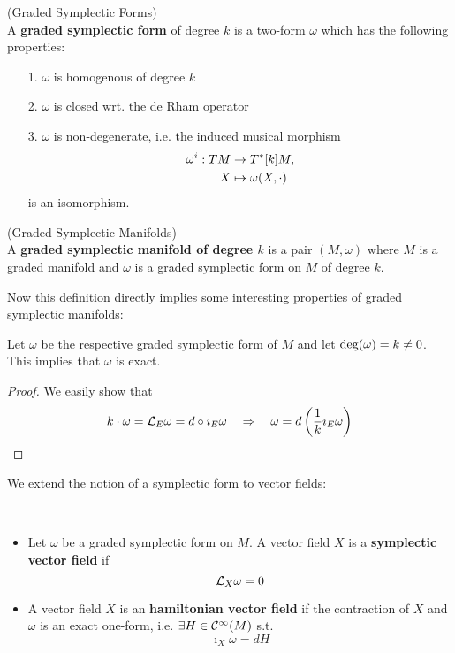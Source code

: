 \begin{definition} (Graded Symplectic Forms)\\
  A \textbf{graded symplectic form} of degree $k$ is a two-form $\omega$ which has the following properties:
  \begin{itemize}
    \item[1.] $\omega$ is homogenous of degree $k$
    \item[2.] $\omega$ is closed wrt. the de Rham operator
    \item[3.] $\omega$ is non-degenerate, i.e. the induced musical morphism
    \begin{align}
      \omega^i : TM &\rightarrow T^*[k]M,\\
      X &\mapsto \omega(X, \cdot)
    \end{align}
    is an isomorphism.
  \end{itemize}
\end{definition}



\begin{definition} (Graded Symplectic Manifolds)\\
  A \textbf{graded symplectic manifold of degree $k$} is a pair $(M, \omega)$ where $M$ is a graded manifold and $\omega$ is a graded symplectic form on $M$ of degree $k$.
\end{definition}

Now this definition directly implies some interesting properties of graded symplectic manifolds:

\begin{lem}
 Let $\omega$ be the respective graded symplectic form of $M$ and let $\operatorname{deg}(\omega) = k \neq 0$. This implies that $\omega$ is exact.

\begin{proof}
  We easily show that
  $$ k \cdot \omega = \mathcal{L}_{E} \omega = d\circ \imath_E\omega \quad \Rightarrow \quad \omega = d\left( \frac{1}{k} \imath_E \omega \right) $$
\end{proof}
\end{lem}

We extend the notion of a symplectic form to vector fields:

\begin{definition}~
\begin{itemize}
  \item Let $\omega$ be a graded symplectic form on $M$. A vector field $X$ is a \textbf{symplectic vector field} if
  $$ \mathcal{L}_{X}\omega = 0 $$

  \item A vector field $X$ is an \textbf{hamiltonian vector field} if the contraction of $X$ and $\omega$ is an exact one-form, i.e. $\exists H \in \mathcal{C}^{\infty}(M)$ s.t.
  $$ \imath_X \omega = dH $$

\end{itemize}
\end{definition}

